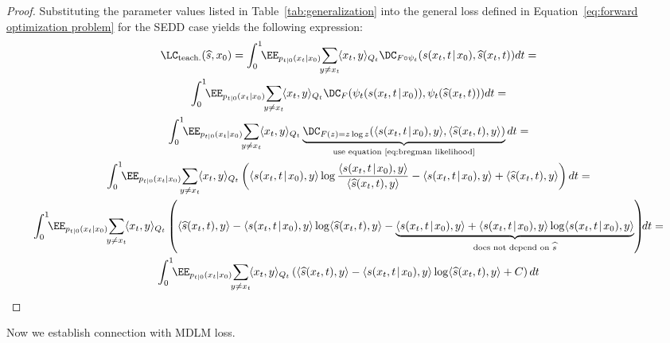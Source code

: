         \begin{proof}
            Substituting the parameter values listed in Table~\ref{tab:generalization} into the general loss defined in Equation~\eqref{eq:forward optimization problem} for the SEDD case yields the following expression:
            \begin{gather}
                \LC_{\text{teach.}}(\widehat{s}, x_0) = \int_0^1 \!\! \EE_{p_{t|0}(x_t|x_0)} \!\! \sum_{y \neq x_t}\!  \langle x_t, y\rangle_{Q_t} \DC_{F\circ\psi_t}\!\left(s(x_t, t \!\mid\! x_0), \widehat{s}(x_t, t)\right) \!dt = 
                \nonumber\\
                \int_0^1 \!\! \EE_{p_{t|0}(x_t|x_0)} \!\! \sum_{y \neq x_t}\!  \langle x_t, y\rangle_{Q_t} \DC_{F}\!\left(\psi_t(s(x_t, t \!\mid\! x_0)), \psi_t(\widehat{s}(x_t, t)\right)) dt = 
                \nonumber\\
                \int_0^1 \!\! \EE_{p_{t|0}(x_t|x_0)} \!\! \sum_{y \neq x_t}\!  \langle x_t, y\rangle_{Q_t} \underbrace{\DC_{F(z) = z \log z}\!\left(\langle s(x_t, t \!\mid\! x_0), y\rangle, \langle \widehat{s}(x_t, t), y \rangle\right)}_{\text{use equation~\eqref{eq:bregman likelihood}}} dt =
                \nonumber\\
                \int_0^1 \!\! \EE_{p_{t|0}(x_t|x_0)} \!\! \sum_{y \neq x_t}\!  \langle x_t, y\rangle_{Q_t} \left(\langle s(x_t, t \!\mid\! x_0), y\rangle \log \frac{\langle s(x_t, t \!\mid\! x_0), y\rangle}{\langle \widehat{s}(x_t, t), y \rangle} -\langle s(x_t, t \!\mid\! x_0), y\rangle + \langle \widehat{s}(x_t, t), y \rangle \right) dt =
                \nonumber\\
                \int_0^1 \!\! \EE_{p_{t|0}(x_t|x_0)} \!\! \sum_{y \neq x_t}\!  \langle x_t, y\rangle_{Q_t} \left(\langle \widehat{s}(x_t, t), y \rangle - \langle s(x_t, t \!\mid\! x_0), y\rangle \log \langle \widehat{s}(x_t, t), y \rangle -\underbrace{\langle s(x_t, t \!\mid\! x_0), y\rangle + \langle s(x_t, t \!\mid\! x_0), y\rangle \log \langle s(x_t, t \!\mid\! x_0), y\rangle}_{\text{does not depend on } \widehat{s}} \right) \!\! dt = 
                \nonumber\\
                \int_0^1 \!\! \EE_{p_{t|0}(x_t|x_0)} \!\! \sum_{y \neq x_t}\!  \langle x_t, y\rangle_{Q_t} \left(\langle \widehat{s}(x_t, t), y \rangle - \langle s(x_t, t \!\mid\! x_0), y\rangle \log \langle \widehat{s}(x_t, t), y \rangle + C \right) dt \nonumber
            \end{gather}      
        \end{proof}
        Now we establish connection with MDLM loss.
